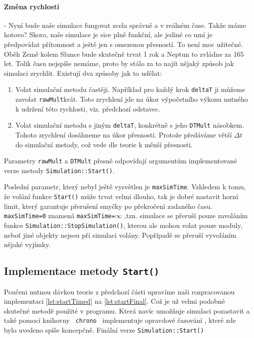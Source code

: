 \paragraph{Změna rychlosti} - Nyní bude naše simulace fungovat zcela správně a v reálném čase. Takže máme hotovo? Skoro, naše simulace je sice plně funkční, ale jediné co umí je předpovídat přítomnost a ještě jen s omezenou přesností. To není moc užitečné. Oběh Země kolem Slunce bude skutečně trvat 1 rok a Neptun to zvládne za 165 let. Tolik času nejspíše nemáme, proto by stálo za to najít nějaký způsob jak simulaci zrychlit. Existují dva způsoby jak to udělat:
\begin{enumerate}
	\item Volat simulační metodu častěji. Například pro každý krok \texttt{deltaT} ji můžeme zavolat \texttt{rawMult}krát. Toto zrychlení jde na úkor výpočetního výkonu nutného k udržení této rychlosti, viz. předchozí odstavec.
	\item Volat simulační metodu s jiným \texttt{deltaT}, konkrétně s jeho \texttt{DTMult} násobkem. Tohoto zrychlení dosáhneme na úkor přesnosti. Protože předáváme větší $ \Delta t $ do simulační metody, což vede dle teorie k měnší přesnosti.
\end{enumerate}
Parametry \texttt{rawMult} a \texttt{DTMult} přesně odpovídají argumentům implementované verze metody \texttt{Simulation::Start()}.

Poslední parametr, který nebyl ještě vysvětlen je \texttt{maxSimTime}. Vzhledem k tomu, že volání funkce \texttt{Start()} může trvat velmi dlouho, tak je dobré nastavit horní limit, který garantuje přerušení smyčky po překročení zadaného času. \texttt{maxSimTime=0} znamená \texttt{maxSimTime=$ \infty $} ,tzn. simulace se přeruší pouze zavoláním funkce \texttt{Simulation::StopSimulation()}, kterou ale mohou volat pouze moduly, neboť jiné objekty nejsou při simulaci volány.
Popřípadě se přeruší vyvoláním nějaké vyjímky.

\subsection{Implementace metody \texttt{Start()}}
Poučeni nutnou dávkou teorie z předchozí části upravíme naši rozpracovanou implementaci \ref{lst:startTimed} na \ref{lst:startFinal}. Což je už velmi podobné skutečné metodě použité v programu. Která navíc umožňuje simulaci pozastavit a také pomocí knihovny \texttt{ chrono  } implementuje opravdové časování , které zde bylo uvedeno spíše koncepčně.
{Finální verze \texttt{Simulation::Start()}}

